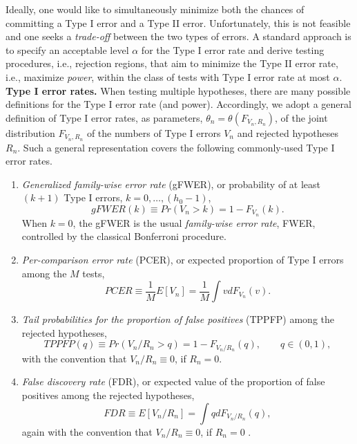 \documentclass[11pt]{article}
\begin{document}
Ideally, one would like to simultaneously minimize both the chances of committing a Type I error and a Type II error. Unfortunately, this is not feasible and one seeks a {\em trade-off} between the two types of errors. A standard approach is to specify an acceptable level $\alpha$ for the Type I error rate and derive testing procedures, i.e., rejection regions, that aim to minimize the Type II error rate, i.e., maximize {\em power}, within the class of tests with Type I error rate at most $\alpha$. \\


\noindent
{\bf Type I error rates.}
When testing multiple hypotheses, there are many possible definitions for the Type I error rate (and power). Accordingly, we adopt a general definition of Type I error rates, as parameters, $\theta_n = \theta(F_{V_n,R_n})$, of the joint distribution $F_{V_n,R_n}$ of the numbers of Type I errors $V_n$ and rejected hypotheses $R_n$. 
Such a general representation covers the following commonly-used Type I error rates.
\begin{enumerate}
\item 
{\em Generalized family-wise error rate} (gFWER), or 
 probability of at least $(k+1)$ Type I errors, $k=0,\ldots, (h_0-1)$,
\begin{equation}\label{anal:mult:e:gFWER}
gFWER(k) \equiv Pr(V_n > k) = 1 - F_{V_n}(k).
\end{equation}
When $k=0$, the gFWER is the usual {\em family-wise error rate}, FWER, controlled by the classical Bonferroni procedure.
\item
{\em Per-comparison error rate} (PCER), or expected 
proportion of Type I errors among the $M$ tests,
\begin{equation}\label{anal:mult:e:PCER}
PCER \equiv \frac{1}{M} E[V_n] = \frac{1}{M} \int v dF_{V_n}(v).
\end{equation}
\item
{\em Tail probabilities for the proportion of false positives} (TPPFP) among the rejected hypotheses,
\begin{equation}\label{anal:mult:e:TPPFP}
TPPFP(q) \equiv Pr(V_n/R_n > q) = 1 - F_{V_n/R_n}(q), \qquad q \in (0,1),
\end{equation}
with the convention that $V_n/R_n \equiv 0$, if $R_n=0$.
\item
{\em False discovery rate} (FDR), or  expected value of the proportion of false positives among the rejected hypotheses, 
\begin{equation}\label{anal:mult:e:FDR}
FDR \equiv E[V_n/R_n] = \int q dF_{V_n/R_n}(q),
\end{equation}
again with the convention that $V_n/R_n \equiv 0$, if $R_n=0$ \cite{Benjamini&Hochberg95}. 
\end{enumerate}
\end{document}
